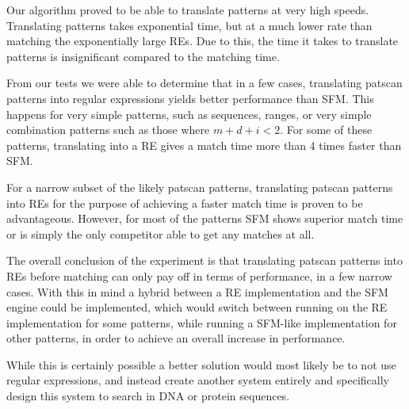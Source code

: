 \documentclass[12pt]{article}
\theoremstyle{definition}
\begin{document}
Our algorithm proved to be able to translate patterns at very high speeds. Translating patterns takes exponential time, but at a much lower rate than matching the exponentially large REs. Due to this, the time it takes to translate patterns is insignificant compared to the matching time.

From our tests we were able to determine that in a few cases, translating patscan patterns into regular expressions yields better performance than SFM. This happens for very simple patterns, such as sequences, ranges, or very simple combination patterns such as those where $m+d+i<2$. For some of these patterns, translating into a RE gives a match time more than 4 times faster than SFM.

For a narrow subset of the likely patscan patterns, translating patscan patterns into REs for the purpose of achieving a faster match time is proven to be advantageous. However, for most of the patterns SFM shows superior match time or is simply the only competitor able to get any matches at all.

The overall conclusion of the experiment is that translating patscan patterns into REs before matching can only pay off in terms of performance, in a few narrow cases. With this in mind a hybrid between a RE implementation and the SFM engine could be implemented, which would switch between running on the RE implementation for some patterns, while running a SFM-like implementation for other patterns, in order to achieve an overall increase in performance.

While this is certainly possible a better solution would most likely be to not use regular expressions, and instead create another system entirely and specifically design this system to search in DNA or protein sequences.

\newpage


\nocite{*}

\end{document}

